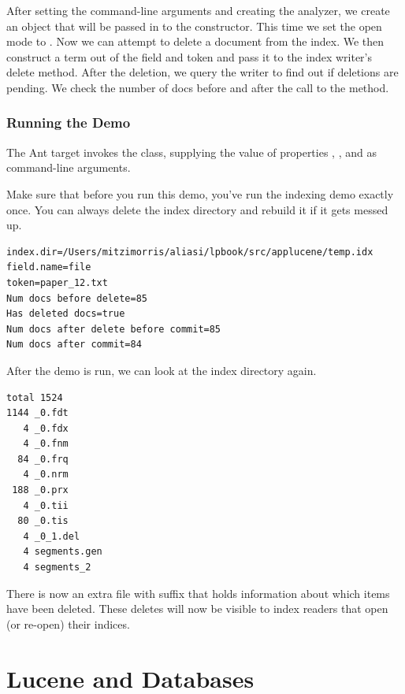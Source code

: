 After setting the command-line arguments and creating the analyzer,
we create an  object that will be passed
in to the  constructor.
%
%
This time we set the open mode to
.
Now we can attempt to delete a document from the index.
%
%
We then construct a term out of the field and token and pass it to
the index writer's delete method.  After the deletion, we query the
writer to find out if deletions are pending.
We check the number of docs before and after the call to the  method.

\subsubsection{Running the Demo}

The Ant target  invokes the class, supplying
the value of properties , , and
 as command-line arguments.  

Make sure that before you run this demo, you've run the indexing
demo exactly once.  You can always delete the index directory and
rebuild it if it gets messed up.
%
\begin{verbatim}
index.dir=/Users/mitzimorris/aliasi/lpbook/src/applucene/temp.idx
field.name=file
token=paper_12.txt
Num docs before delete=85
Has deleted docs=true
Num docs after delete before commit=85
Num docs after commit=84
\end{verbatim}

After the demo is run, we can look at the index directory again.
%
\begin{verbatim}
total 1524
1144 _0.fdt
   4 _0.fdx
   4 _0.fnm
  84 _0.frq
   4 _0.nrm
 188 _0.prx
   4 _0.tii
  80 _0.tis
   4 _0_1.del
   4 segments.gen
   4 segments_2
\end{verbatim}
%
There is now an extra file with suffix  that holds
information about which items have been deleted.  These deletes will
now be visible to index readers that open (or re-open) their
indices.

\section{Lucene and Databases}

